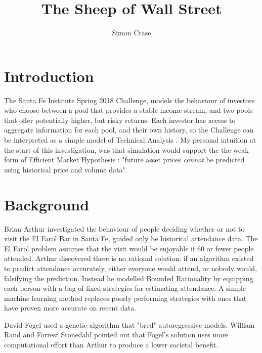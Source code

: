 \documentclass[]{article}
\title{The Sheep of Wall Street}
\author{Simon Crase}
\begin{document}
\maketitle

\begin{abstract}

\end{abstract}

\section{Introduction}
The Santa Fe Institute Spring 2018 Challenge\cite{Challenge:2018}, models the behaviour of investors who choose between a pool that provides a stable income stream, and two pools that offer potentially higher, but risky returns. Each investor has access to aggregate information for each pool, and their own history, so the Challenge can be interpreted as a simple model of Technical Analysis\cite[Chapter 5]{romero2014hedge} \cite{wiki:technical}. My personal intuition at the start of this investigation, was that simulation would support the the weak form of Efficient Market Hypothesis \cite[Chapter 8]{romero2014hedge} \cite{wiki:emh}: "future asset prices \emph{cannot} be predicted using historical price and volume data".

\section{Background}
Brian Arthur \cite{arthur1994inductive} investigated the behaviour of people deciding whether or not to visit the El Farol Bar in Santa Fe, guided only be historical attendance data. The El Farol problem assumes that the visit would be enjoyable if 60 or fewer people attended. Arthur discovered there is no rational solution: if an algorithm existed to predict attendance accurately, either everyone would attend, or nobody would, falsifying the prediction. Instead he modelled Bounded Rationality by equipping each person with a bag of fixed strategies for estimating attendance. A simple machine learning method replaces poorly performing strategies with ones that have proven more accurate on recent data.


David Fogel \cite{fogel1999inductive} used a genetic algorithm that "bred" autoregressive models. William Rand and Forrest Stonedahl\cite{rand2007farol} pointed out that Fogel's solution uses more computational effort than Arthur to produce a lower societal benefit.
\end{document}
